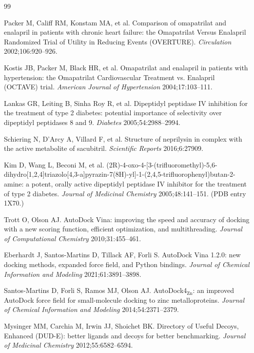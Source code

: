 \documentclass[11pt,a4paper]{article}
\begin{document}
\newpage
\begin{thebibliography}{99}
\small

Packer M, Califf RM, Konstam MA, et al.
Comparison of omapatrilat and enalapril in patients with chronic heart failure:
the Omapatrilat Versus Enalapril Randomized Trial of Utility in Reducing Events
(OVERTURE). \textit{Circulation} 2002;106:920--926.

Kostis JB, Packer M, Black HR, et al.
Omapatrilat and enalapril in patients with hypertension: the Omapatrilat
Cardiovascular Treatment vs. Enalapril (OCTAVE) trial.
\textit{American Journal of Hypertension} 2004;17:103--111.

Lankas GR, Leiting B, Sinha Roy R, et al.
Dipeptidyl peptidase IV inhibition for the treatment of type 2 diabetes:
potential importance of selectivity over dipeptidyl peptidases 8 and 9.
\textit{Diabetes} 2005;54:2988--2994.

Schiering N, D'Arcy A, Villard F, et al.
Structure of neprilysin in complex with the active metabolite of sacubitril.
\textit{Scientific Reports} 2016;6:27909.

Kim D, Wang L, Beconi M, et al.
(2R)-4-oxo-4-[3-(trifluoromethyl)-5,6-dihydro[1,2,4]triazolo[4,3-a]pyrazin-7(8H)-yl]-1-(2,4,5-trifluorophenyl)butan-2-amine:
a potent, orally active dipeptidyl peptidase IV inhibitor for the treatment of
type 2 diabetes. \textit{Journal of Medicinal Chemistry} 2005;48:141--151.
(PDB entry 1X70.)

Trott O, Olson AJ.
AutoDock Vina: improving the speed and accuracy of docking with a new scoring
function, efficient optimization, and multithreading.
\textit{Journal of Computational Chemistry} 2010;31:455--461.

Eberhardt J, Santos-Martins D, Tillack AF, Forli S.
AutoDock Vina 1.2.0: new docking methods, expanded force field, and Python
bindings. \textit{Journal of Chemical Information and Modeling}
2021;61:3891--3898.

Santos-Martins D, Forli S, Ramos MJ, Olson AJ.
AutoDock4$_{\text{Zn}}$: an improved AutoDock force field for small-molecule
docking to zinc metalloproteins.
\textit{Journal of Chemical Information and Modeling} 2014;54:2371--2379.

Mysinger MM, Carchia M, Irwin JJ, Shoichet BK.
Directory of Useful Decoys, Enhanced (DUD-E): better ligands and decoys for
better benchmarking.
\textit{Journal of Medicinal Chemistry} 2012;55:6582--6594.


\end{thebibliography}
\end{document}
